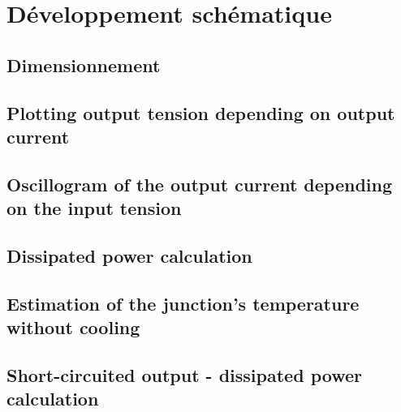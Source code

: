 \section{Développement schématique}
\subsection{Dimensionnement} \label{ssec:num11}
{}
\subsection{Plotting output tension depending on output current} \label{ssec:num12}
{}
\subsection{Oscillogram of the output current depending on the input tension} \label{ssec:num13}
{}
\subsection{Dissipated power calculation} \label{ssec:num14}
{}
\subsection{Estimation of the junction's temperature without cooling} \label{ssec:num15}
{}
\subsection{Short-circuited output - dissipated power calculation} \label{ssec:num16}
{}
\clearpage